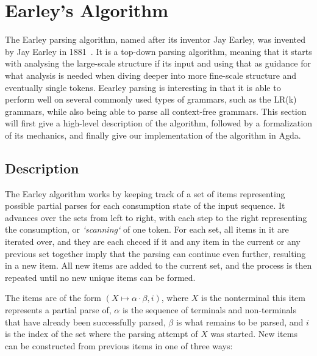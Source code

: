 \chapter{Earley's Algorithm} \label{Earleys}

	The Earley parsing algorithm, named after its inventor Jay Earley, was
	invented by Jay Earley in 1881~\cite{Earley}. It is a top-down parsing
	algorithm, meaning that it starts with analysing the large-scale structure
	if its input and using that as guidance for what analysis is needed when
	diving deeper into more fine-scale structure and eventually single tokens.
	Eearley parsing is interesting in that it is able to perform well on
	several commonly used types of grammars, such as the LR(k) grammars, while
	also being able to parse all context-free grammars. This section will first
	give a high-level description of the algorithm, followed by a formalization
	of its mechanics, and finally give our implementation of the algorithm in
	Agda.

	\section{Description}
		
		The Earley algorithm works by keeping track of a set of items
		representing possible partial parses for each consumption state of the
		input sequence. It advances over the sets from left to right, with each 
		step to the right representing the consumption, or \emph{`scanning`} of 
		one token. For each set, all items in it are iterated over, and they 
		are each checed if it and any item in the current or any previous set 
		together imply that the parsing can continue even further, resulting in 
		a new item. All new items are added to the current set, and the process 
		is then repeated until no new unique items can be formed.

		The items are of the form $(X \mapsto \alpha \cdot \beta, i)$, where
		$X$ is the nonterminal this item represents a partial parse of,
		$\alpha$ is the sequence of terminals and non-terminals that have
		already been successfully parsed, $\beta$ is what remains to be parsed,
		and $i$ is the index of the set where the parsing attempt of $X$ was
		started. New items can be constructed from previous items in one of
		three ways:

